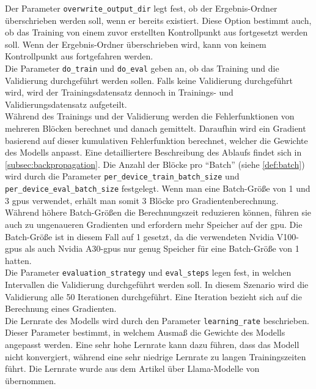 Der Parameter \texttt{overwrite\_output\_dir} legt fest, ob der Ergebnis-Ordner überschrieben werden soll, wenn er bereits existiert.
Diese Option bestimmt auch, ob das Training von einem zuvor erstellten Kontrollpunkt aus fortgesetzt werden soll.
Wenn der Ergebnis-Ordner überschrieben wird, kann von keinem Kontrollpunkt aus fortgefahren werden.\\

Die Parameter \texttt{do\_train} und \texttt{do\_eval} geben an, ob das Training und die Validierung durchgeführt werden sollen.
Falls keine Validierung durchgeführt wird, wird der Trainingsdatensatz dennoch in Trainings- und Validierungsdatensatz aufgeteilt.\\

Während des Trainings und der Validierung werden die Fehlerfunktionen von mehreren Blöcken berechnet und danach gemittelt.
Daraufhin wird ein Gradient basierend auf dieser kumulativen Fehlerfunktion berechnet, welcher die Gewichte des Modells anpasst.
Eine detailliertere Beschreibung des Ablaufs findet sich in \cref{subsec:backpropagation}.
Die Anzahl der Blöcke pro \enquote{Batch} (siehe \cref{def:batch}) wird durch die Parameter \texttt{per\_device\_train\_batch\_size} und \texttt{per\_device\_eval\_batch\_size} festgelegt.
Wenn man eine Batch-Größe von 1 und 3 \ac{gpu}s verwendet, erhält man somit 3 Blöcke pro Gradientenberechnung.
Während höhere Batch-Größen die Berechnungszeit reduzieren können, führen sie auch zu ungenaueren Gradienten und erfordern mehr Speicher auf der \ac{gpu}.
Die Batch-Größe ist in diesem Fall auf 1 gesetzt, da die verwendeten Nvidia V100-\ac{gpu}s als auch Nvidia A30-\ac{gpu}s nur genug Speicher für eine Batch-Größe von 1 hatten.\\

Die Parameter \texttt{evaluation\_strategy} und \texttt{eval\_steps} legen fest, in welchen Intervallen die Validierung durchgeführt werden soll.
In diesem Szenario wird die Validierung alle 50 Iterationen durchgeführt.
Eine Iteration bezieht sich auf die Berechnung eines Gradienten.\\

Die Lernrate des Modells wird durch den Parameter \texttt{learning\_rate} beschrieben.
Dieser Parameter bestimmt, in welchem Ausmaß die Gewichte des Modells angepasst werden.
Eine sehr hohe Lernrate kann dazu führen, dass das Modell nicht konvergiert, während eine sehr niedrige Lernrate zu langen Trainingszeiten führt.
Die Lernrate wurde aus dem Artikel über Llama-Modelle von \citet{llama} übernommen.\\

